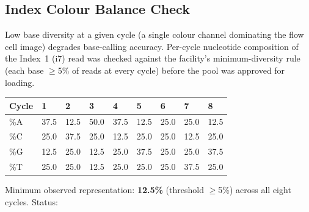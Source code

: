 \subsection{Index Colour Balance Check}

Low base diversity at a given cycle (a single colour channel dominating the flow cell image)
degrades base-calling accuracy. Per-cycle nucleotide composition of the Index~1 (i7) read was
checked against the facility's minimum-diversity rule (each base $\geq$5\% of reads at every
cycle) before the pool was approved for loading.

\begin{center}
\small
\begin{tabular}{@{} l C{0.9cm} C{0.9cm} C{0.9cm} C{0.9cm} C{0.9cm} C{0.9cm} C{0.9cm} C{0.9cm} @{}}
\toprule
{}
{\color{white}\bfseries Cycle} & {\color{white}\bfseries 1} & {\color{white}\bfseries 2} & {\color{white}\bfseries 3} & {\color{white}\bfseries 4} & {\color{white}\bfseries 5} & {\color{white}\bfseries 6} & {\color{white}\bfseries 7} & {\color{white}\bfseries 8} \\
\midrule
\%A & 37.5 & 12.5 & 50.0 & 37.5 & 12.5 & 25.0 & 25.0 & 12.5 \\
\%C & 25.0 & 37.5 & 25.0 & 12.5 & 25.0 & 25.0 & 12.5 & 25.0 \\
\%G & 12.5 & 25.0 & 12.5 & 25.0 & 37.5 & 25.0 & 25.0 & 37.5 \\
\%T & 25.0 & 25.0 & 12.5 & 25.0 & 25.0 & 25.0 & 37.5 & 25.0 \\
\bottomrule
\end{tabular}
\end{center}

\vspace{4pt}
\noindent Minimum observed representation: \textbf{12.5\%} (threshold $\geq$5\%) across all
eight cycles. \quad Status: \passchip
